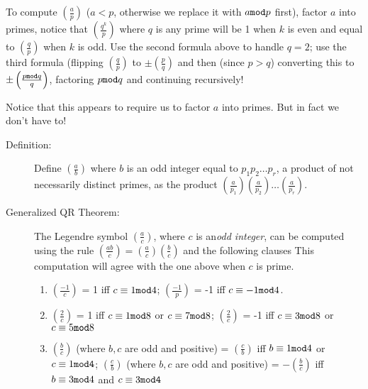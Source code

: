 \documentclass[12pt]{article}
\begin{document}
To compute $\left(\frac ap\right)$ ($a<p$, otherwise we replace it with $a{\tt mod}p$ first), factor $a$ into primes, notice that $\left(\frac{q^k}p\right)$ where $q$ is any prime will be 1 when $k$ is even and equal to $\left(\frac{q}p\right)$  when $k$ is odd.   Use the second formula
above to handle $q=2$; use the third formula (flipping $\left(\frac qp\right)$ to $\pm \left(\frac pq\right)$ and then (since $p>q$) converting this to $\pm \left(\frac{p{\tt mod}q}q\right)$, factoring $p {\tt mod}q$ and continuing recursively!

Notice that this appears to require us to factor $a$ into primes.   But in fact we don't have to!

\begin{description}

\item[Definition:]  Define $\left(\frac ab\right)$ where $b$ is an odd integer equal to $p_1p_2\ldots p_r$, a product of not necessarily distinct primes, as the product  $\left(\frac a{p_1}\right)\left(\frac a{p_2}\right)\ldots\left(\frac a{p_r}\right)$.

\item[Generalized QR Theorem:]   The Legendre symbol $\left(\frac ac\right)$, where $c$ is an{\em  odd integer\/},  can be computed using the rule $\left(\frac{ab}c\right) = \left(\frac ac\right)\left(\frac bc\right)$ and the following clauses
This computation will agree with the one above when $c$ is prime.

\begin{enumerate}

\item  $\left(\frac{-1}c\right)$ = 1 iff $c \equiv1{\tt mod}4$; $\left(\frac{-1}p\right)$ = -1 iff $c \equiv-1{\tt mod}4$.

\item   $\left(\frac{2}c\right)$ = 1 iff $c \equiv 1{\tt mod}8$ or  $c \equiv 7{\tt mod}8$;   $\left(\frac{2}c\right)$ = -1 iff $c \equiv 3{\tt mod}8$ or  $c \equiv 5{\tt mod}8$

\item  $\left(\frac bc\right)$ (where $b,c$ are odd and positive) = $\left(\frac cb\right)$ iff $b \equiv 1{\tt mod}4$ or $c \equiv 1{\tt mod 4}$;    $\left(\frac cb\right)$ (where $b,c$ are odd and positive) = $-\left(\frac bc\right)$ iff $b \equiv 3{\tt mod}4$ and $c \equiv 3{\tt mod 4}$

\end{enumerate}

\end{description}
\end{document}
